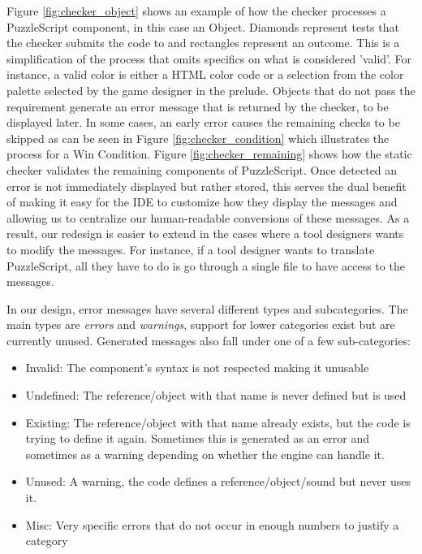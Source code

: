 Figure \ref{fig:checker_object} shows an example of how the checker processes a PuzzleScript component, in this case an Object. Diamonds represent tests that the checker submits the code to and rectangles represent an outcome. This is a simplification of the process that omits specifics on what is considered 'valid'. For instance, a valid color is either a HTML color code or a selection from the color palette selected by the game designer in the prelude. Objects that do not pass the requirement generate an error message that is returned by the checker, to be displayed later. In some cases, an early error causes the remaining checks to be skipped as can be seen in Figure \ref{fig:checker_condition} which illustrates the process for a Win Condition. Figure \ref{fig:checker_remaining} shows how the static checker validates the remaining components of PuzzleScript. Once detected an error is not immediately displayed but rather stored\dd, this serves the dual benefit of making it easy for the IDE to customize how they display the messages and allowing us to centralize our human-readable conversions of these messages. As a result, our redesign is easier to extend in the cases where a tool designers wants to modify the messages. For instance, if a tool designer wants to translate PuzzleScript, all they have to do is go through a single file to have access to the messages. 

In our design, error messages have several different types and subcategories. The main types are \emph{errors} and \emph{warnings}, support for lower categories exist but are currently unused. Generated messages also fall under one of a few sub-categories:
\begin{itemize}
    \item Invalid: The component's syntax is not respected making it unusable
    \item Undefined: The reference/object with that name is never defined but is used
    \item Existing:  The reference/object with that name already exists, but the code is trying to define it again. Sometimes this is generated as an error and sometimes as a warning depending on whether the engine can handle it.
    \item Unused: A warning, the code defines a reference/object/sound but never uses it\dd.
    \item Misc: Very specific errors that do not occur in enough numbers to justify a category
\end{itemize}

